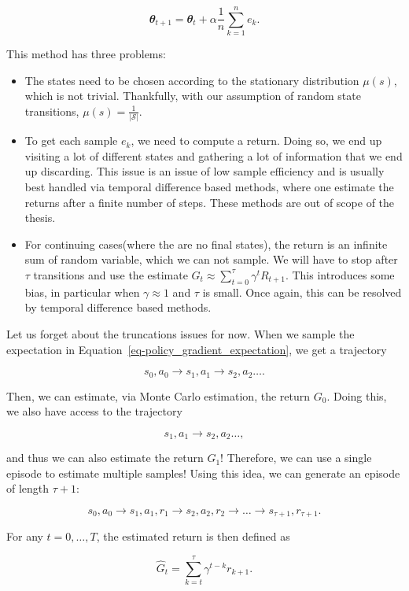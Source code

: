 \documentclass[
  letterpaper,
]{report}
\providecommand{\tightlist}{%
  \setlength{\itemsep}{0pt}\setlength{\parskip}{0pt}}\usepackage{longtable,booktabs,array}
\theoremstyle{definition}
\theoremstyle{plain}
\theoremstyle{definition}
\theoremstyle{remark}
\begin{document}
\[
\mathbfit{\theta}_{t+1} = \mathbfit{\theta}_t + \alpha\frac{1}{n}\sum_{k=1}^n e_k.
\]

This method has three problems:

\begin{itemize}
\tightlist
\item
  The states need to be chosen according to the stationary distribution
  \(\mu(s)\), which is not trivial. Thankfully, with our assumption of
  random state transitions, \(\mu(s) = \frac{1}{|\mathcal{S}|}\).
\item
  To get each sample \(e_k\), we need to compute a return. Doing so, we
  end up visiting a lot of different states and gathering a lot of
  information that we end up discarding. This issue is an issue of low
  sample efficiency and is usually best handled via temporal difference
  based methods, where one estimate the returns after a finite number of
  steps. These methods are out of scope of the thesis.
\item
  For continuing cases(where the are no final states), the return is an
  infinite sum of random variable, which we can not sample. We will have
  to stop after \(\tau\) transitions and use the estimate
  \(G_t \approx \sum_{t=0}^\tau \gamma^t R_{t+1}\). This introduces some
  bias, in particular when \(\gamma \approx 1\) and \(\tau\) is small.
  Once again, this can be resolved by temporal difference based methods.
\end{itemize}

Let us forget about the truncations issues for now. When we sample the
expectation in Equation~\ref{eq-policy_gradient_expectation}, we get a
trajectory

\[
s_0,a_0 \to s_{1}, a_{1} \to s_{2},a_{2} \dots .
\]

Then, we can estimate, via Monte Carlo estimation, the return \(G_0\).
Doing this, we also have access to the trajectory

\[
s_{1}, a_{1} \to s_{2},a_{2} \dots,
\]

and thus we can also estimate the return \(G_{1}\)! Therefore, we can
use a single episode to estimate multiple samples! Using this idea, we
can generate an episode of length \(\tau +1\):

\[
s_0,a_0 \to s_1,a_1,r_1 \to s_2,a_2,r_2 \to \dots \to s_{\tau +1}, r_{\tau +1}.
\]

For any \(t = 0,\dots ,T\), the estimated return is then defined as

\[
\hat{G}_t = \sum_{k=t}^\tau \gamma^{t-k}r_{k+1}.
\]
\end{document}
